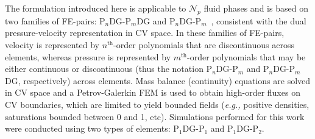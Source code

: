 \documentclass[preprint,authoryear,12pt]{elsarticle}
\newcommand{\PN}[2][error]{P$_{#1}$DG-P$_{#2}$}
\newcommand{\PNDG}[2][error]{P$_{#1}$DG-P$_{#2}$DG}
\newcommand{\eg}{{\it e.g., }}
\begin{document}






The formulation introduced here is applicable to $\mathcal{N}_{p}$ fluid phases and is based on two families of FE-pairs: \PNDG[n]{m} and \PN[n]{m}~\citep{cotter_2009a}, consistent with the dual pressure-velocity representation in CV space. In these families of FE-pairs, velocity is represented by $n^{\text{th}}$-order polynomials that are discontinuous across elements, whereas pressure is represented by $m^{\text{th}}$-order polynomials that may be either continuous or discontinuous (thus the notation \PN[n]{m} and \PNDG[n]{m}, respectively) across elements. Mass balance (continuity) equations are solved in CV space and a Petrov-Galerkin FEM is used to obtain high-order fluxes on CV boundaries, which are limited to yield bounded fields (\eg positive densities, saturations bounded between 0 and 1, etc). Simulations performed for this work were conducted using two types of elements: \PN[1]{1} and \PN[1]{2}.
\end{document}
